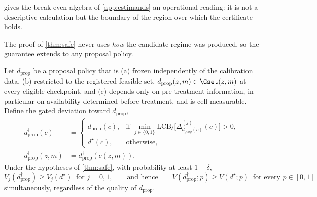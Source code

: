  gives the break-even algebra of \cref{app:estimands} an
operational reading: it is not a descriptive calculation but the boundary of the
region over which the certificate holds.

The proof of \cref{thm:safe} never uses \emph{how} the candidate regime was
produced, so the guarantee extends to any proposal policy.

\begin{corollary}
\label{cor:proposal}
Let $d_{\mathrm{prop}}$ be a proposal policy that is (a) frozen independently of
the calibration data, (b) restricted to the registered feasible set,
$d_{\mathrm{prop}}(z,m)\in\Gset(z,m)$ at every eligible checkpoint, and (c)
depends only on pre-treatment information, in particular on availability
determined before treatment, and is cell-measurable.  Define the gated deviation
toward $d_{\mathrm{prop}}$,
\begin{equation}
 \begin{aligned}
 d^{\dagger}_{\mathrm{prop}}(c)&=
 \begin{cases}
  d_{\mathrm{prop}}(c), & \text{if }\displaystyle\min_{j\in\{0,1\}}\mathrm{LCB}_\delta\big[\Delta^{(j)}_{d_{\mathrm{prop}}(c)}(c)\big]>0,\\[1ex]
  d^\star(c), & \text{otherwise,}
 \end{cases}\\
 d^{\dagger}_{\mathrm{prop}}(z,m)&=d^{\dagger}_{\mathrm{prop}}(c(z,m)).
 \end{aligned}
 \label{eq:proposal-rule}
\end{equation}
Under the hypotheses of \cref{thm:safe}, with probability at least $1-\delta$,
\begin{equation}
 V_j(d^{\dagger}_{\mathrm{prop}})\ge V_j(d^\star)\ \text{ for }j=0,1,
 \qquad\text{and hence}\qquad
 V(d^{\dagger}_{\mathrm{prop}};p)\ge V(d^\star;p)\ \text{ for every }p\in[0,1]
 \label{eq:proposal-safe}
\end{equation}
simultaneously, regardless of the quality of $d_{\mathrm{prop}}$.
\end{corollary}

